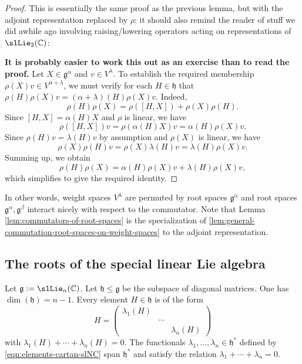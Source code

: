 \documentclass[reqno]{amsart} 
\begin{document}
\begin{proof}
  This is essentially the same proof as the previous lemma, but with the adjoint representation replaced by $\rho$; it should also remind the reader of stuff we did awhile ago involving raising/lowering operators acting on representations of $\slLie_2(\mathbb{C})$:

  { \bf It is probably easier to work this out as an exercise than to read the proof.  } Let $X \in \mathfrak{g}^\alpha$ and $v \in V^\lambda$.  To establish the required membership $\rho(X) v \in V^{\alpha + \lambda}$, we must verify for each $H \in \mathfrak{h}$ that $\rho(H) \rho(X) v = (\alpha + \lambda)(H) \rho(X) v$.  Indeed,
  \begin{equation*}
    \rho(H) \rho(X) = \rho([H,X]) + \rho(X) \rho(H).
  \end{equation*}
  Since $[H,X] = \alpha(H) X$ and $\rho$ is linear, we have
  \begin{equation*}
    \rho([H,X]) v = \rho(\alpha(H) X) v = \alpha(H) \rho(X) v.
  \end{equation*}
  Since $\rho(H) v = \lambda(H) v$ by assumption and $\rho(X)$ is linear, we have
  \begin{equation*}
    \rho(X) \rho(H) v = \rho(X) \lambda(H) v = \lambda(H) \rho(X) v.
  \end{equation*}
  Summing up, we obtain
  \begin{equation*}
    \rho(H) \rho(X) = \alpha(H) \rho(X) v + \lambda(H) \rho(X) v,
  \end{equation*}
  which simplifies to give the required identity.
\end{proof}

In other words, weight spaces $V^\lambda$ are permuted by root spaces $\mathfrak{g}^\alpha$ and root spaces $\mathfrak{g}^\alpha, \mathfrak{g}^\beta$ interact nicely with respect to the commutator.  Note that Lemma \ref{lem:commutators-of-root-spaces} is the specialization of \ref{lem:general-commutation-root-spaces-on-weight-spaces} to the adjoint representation.

\subsection{The roots of the special linear Lie algebra\label{sec:roots-sln}}
\label{sec:orgca2a787}
Let $\mathfrak{g} := \slLie_n(\mathbb{C})$.  Let $\mathfrak{h} \leq \mathfrak{g}$ be the subspace of diagonal matrices.  One has $\dim(\mathfrak{h}) = n-1$.  Every element $H \in \mathfrak{h}$ is of the form
\begin{equation}\label{eqn:elements-cartan-slNC}
  H =
  \begin{pmatrix}
    \lambda_1(H) &  &  \\
           & \dotsb  &  \\
           &  & \lambda_n(H)
  \end{pmatrix}
\end{equation}
with $\lambda_1(H) + \dotsb + \lambda_n(H) = 0$.  The functionals $\lambda_1,\dotsc,\lambda_n \in \mathfrak{h}^*$ defined by \eqref{eqn:elements-cartan-slNC} span $\mathfrak{h}^*$ and satisfy the relation $\lambda_1 + \dotsb + \lambda_n = 0$.
\end{document}
